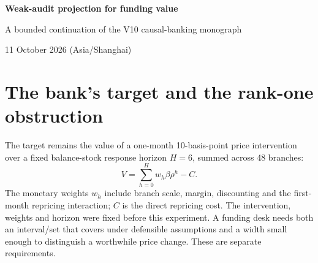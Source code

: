 \documentclass[11pt,a4paper]{article}
\begin{document}
\begin{center}
{\LARGE\bfseries Weak-audit projection for funding value\par}
\vspace{5mm}
{\large A bounded continuation of the V10 causal-banking monograph\par}
\vspace{3mm}
11 October 2026 (Asia/Shanghai)\par
\end{center}

\begin{abstract}
The V10 funding interval refuses inference when a representative identity
audit cannot distinguish two candidate portfolio assignments. This supplement
tests a different reporting design: simultaneous bands for the four observable
candidate monetary responses, exact binomial audit intervals, and projection
through the assignment inverse without dividing by a nearly zero estimated
rank. In 3,000 fresh paired synthetic requests, the resulting set has high
all-request coverage but markedly worse financial precision. At the near-rank
design, 546 of 600 sets equal the whole real line. Exact audit inversion does
not make the response bands finite-sample exact, verify causal exogeneity, or
provide a bank decision threshold. The frozen V10 monograph is unchanged;
this is an author-reviewed research supplement, not an implemented product.
\end{abstract}

\section{The bank's target and the rank-one obstruction}

The target remains the value of a one-month 10-basis-point price intervention
over a fixed balance-stock response horizon $H=6$, summed across 48 branches:
\begin{equation}\label{eq:target}
 V=\sum_{h=0}^{H}w_h\beta\rho^h-C.
\end{equation}
The monetary weights $w_h$ include branch scale, margin, discounting and the
first-month repricing interaction; $C$ is the direct repricing cost. The
intervention, weights and horizon were fixed before this experiment. A funding
desk needs both an interval/set that covers under defensible assumptions and
a width small enough to distinguish a worthwhile price change. These are
separate requirements.
\end{document}
